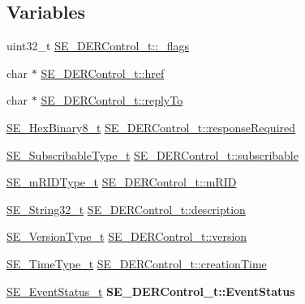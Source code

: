 \subsection*{Variables}
\begin{DoxyCompactItemize}
\item 
uint32\+\_\+t \hyperlink{group__DERControl_ga52dda811cfca73e6781ad02d31086a65}{S\+E\+\_\+\+D\+E\+R\+Control\+\_\+t\+::\+\_\+flags}
\item 
char $\ast$ \hyperlink{group__DERControl_ga8a2640fa1741cf7ff9d7cbc61a4e5a98}{S\+E\+\_\+\+D\+E\+R\+Control\+\_\+t\+::href}
\item 
char $\ast$ \hyperlink{group__DERControl_ga806b4c2bc9bcd1bc266ade8162433189}{S\+E\+\_\+\+D\+E\+R\+Control\+\_\+t\+::reply\+To}
\item 
\hyperlink{group__HexBinary8_gaecf2dab3615fb954a693c017a61f77d6}{S\+E\+\_\+\+Hex\+Binary8\+\_\+t} \hyperlink{group__DERControl_gaf2999637e9a94c1c27d0db7a93e44f2c}{S\+E\+\_\+\+D\+E\+R\+Control\+\_\+t\+::response\+Required}
\item 
\hyperlink{group__SubscribableType_ga5c41f553d369710ed34619266bf2551e}{S\+E\+\_\+\+Subscribable\+Type\+\_\+t} \hyperlink{group__DERControl_ga5ad57e29338dc1d42895e53cbf04262b}{S\+E\+\_\+\+D\+E\+R\+Control\+\_\+t\+::subscribable}
\item 
\hyperlink{group__mRIDType_gac74622112f3a388a2851b2289963ba5e}{S\+E\+\_\+m\+R\+I\+D\+Type\+\_\+t} \hyperlink{group__DERControl_ga0ea191ea24dce47c5860cab985a327ec}{S\+E\+\_\+\+D\+E\+R\+Control\+\_\+t\+::m\+R\+ID}
\item 
\hyperlink{group__String32_gac9f59b06b168b4d2e0d45ed41699af42}{S\+E\+\_\+\+String32\+\_\+t} \hyperlink{group__DERControl_ga5526265cc4f511484ec5ee50458a33ce}{S\+E\+\_\+\+D\+E\+R\+Control\+\_\+t\+::description}
\item 
\hyperlink{group__VersionType_ga4b8d27838226948397ed99f67d46e2ae}{S\+E\+\_\+\+Version\+Type\+\_\+t} \hyperlink{group__DERControl_gaa5a815f8a9d72a61d295548d8ef878d5}{S\+E\+\_\+\+D\+E\+R\+Control\+\_\+t\+::version}
\item 
\hyperlink{group__TimeType_ga6fba87a5b57829b4ff3f0e7638156682}{S\+E\+\_\+\+Time\+Type\+\_\+t} \hyperlink{group__DERControl_ga9d5738589e0b4a269f3f845eb6f5f730}{S\+E\+\_\+\+D\+E\+R\+Control\+\_\+t\+::creation\+Time}
\item 
\mbox{\label{group__DERControl_gabeb0e0dc312c97dfe0935f014feceb2d}} 
\hyperlink{structSE__EventStatus__t}{S\+E\+\_\+\+Event\+Status\+\_\+t} {\bfseries S\+E\+\_\+\+D\+E\+R\+Control\+\_\+t\+::\+Event\+Status}

\end{DoxyCompactItemize}
